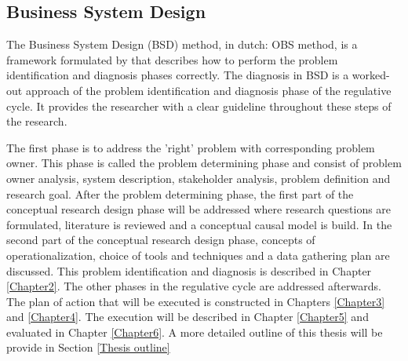 \subsection{Business System Design} \label{BSD}
The Business System Design (BSD) method, in dutch: OBS method, is a framework formulated by \citet{Prins2008} that describes how to perform the problem identification and diagnosis phases correctly. The diagnosis in BSD is a worked-out approach of the problem identification and diagnosis phase of the regulative cycle. It provides the researcher with a clear guideline throughout these steps of the research. 

The first phase is to address the 'right' problem with corresponding problem owner. This phase is called the problem determining phase and consist of problem owner analysis, system description, stakeholder analysis, problem definition and research goal. After the problem determining phase, the first part of the conceptual research design phase will be addressed where research questions are formulated, literature is reviewed and a conceptual causal model is build. In the second part of the conceptual research design phase, concepts of operationalization, choice of tools and techniques and a data gathering plan are discussed. This problem identification and diagnosis is described in Chapter \ref{Chapter2}. The other phases in the regulative cycle are addressed afterwards. The plan of action that will be executed is constructed in Chapters \ref{Chapter3} and \ref{Chapter4}. The execution will be described in Chapter \ref{Chapter5} and evaluated in Chapter \ref{Chapter6}. A more detailed outline of this thesis will be provide in Section \ref{Thesis outline}
